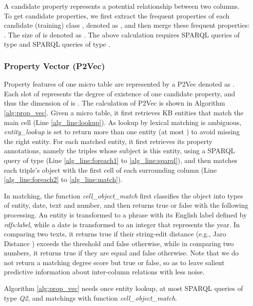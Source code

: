 \documentclass{article}
\begin{document}
A candidate property represents a potential relationship between two columns.
To get candidate properties, 
we first extract the frequent properties of each candidate (training) class , denoted as ,
and then merge these frequent properties: 
.
The size of  is denoted as .
The above calculation requires  SPARQL queries of type  
and  SPARQL queries of type .




\subsubsection{Property Vector (P2Vec)}
Property features of one micro table are represented by a P2Vec denoted as .
Each slot of  represents the degree of existence of one candidate property, 
and thus the dimension of  is .
The calculation of P2Vec is shown in Algorithm \ref{alg:prop_vec}.
Given a micro table, it first retrieves KB entities that match the main cell (Line \ref{alg_line:lookup}).
As lookup by lexical matching is ambiguous,
\textit{entity\_lookup} is set to return more than one entity (at most ) to avoid missing the right entity. 
For each matched entity, it first retrieves its property annotations, namely the triples whose subject is this entity, using a SPARQL query of type  (Line \ref{alg_line:foreach1} to \ref{alg_line:sparql}),
and then matches each triple's object with the first cell of each surrounding column (Line \ref{alg_line:foreach2} to \ref{alg_line:match}).

In matching, the function \textit{cell\_object\_match} first classifies the object  into types of entity, date, text and number, 
and then returns true or false with the following processing.
An entity is transformed to a phrase with its English label defined by \textit{rdfs:label},
while 
a date is transformed to an integer that represents the year.
In comparing two texts, it returns true if their string-edit distance (e.g., Jaro Distance \cite{cohen2003comparison}) exceeds the threshold  and false otherwise,
while in comparing two numbers, it returns true if they are equal and false otherwise. 
Note that we do not
return a 
matching degree score but true or false, 
so as to leave salient predictive information about inter-column relations with less noise.


Algorithm \ref{alg:prop_vec} needs once entity lookup, at most  SPARQL queries of type \textit{Q2}, 
and  matchings with function \textit{cell\_object\_match}.
\end{document}
